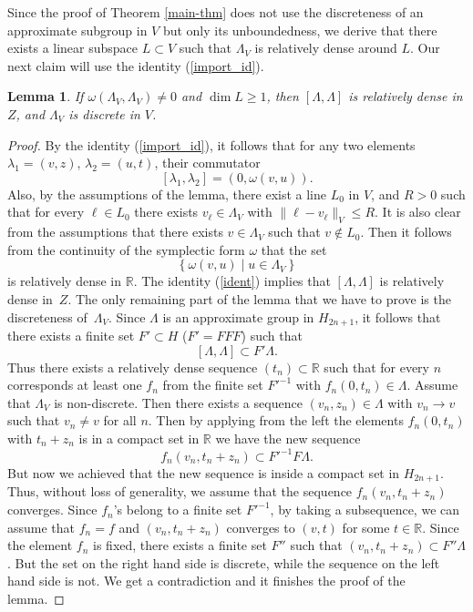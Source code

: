 \documentclass[10pt]{amsart}
\newcommand{\bR}{\mathbb{R}}
\newcounter{dummy} \numberwithin{dummy}{section}
\theoremstyle{plain}
\newtheorem{lemma}[dummy]{Lemma}
\theoremstyle{definition}
\begin{document}
Since the proof of Theorem \ref{main-thm} does not use the discreteness of an approximate subgroup in $V$ but only its unboundedness, we derive that there exists a linear subspace $L \subset V$ such that $\Lambda_V$ is relatively dense around $L$. Our next claim will use the identity (\ref{import_id}).

\begin{lemma}
\label{lem2}
If $\omega(\Lambda_V,\Lambda_V) \neq 0$ and $\dim L \ge 1$, then $[\Lambda,\Lambda]$ is relatively dense in $Z$, and $\Lambda_V$ is discrete in $V$.
\end{lemma}
\begin{proof}
By the identity (\ref{import_id}), it follows that for any two elements $\lambda_1 = (v,z)$, $\lambda_2 = (u,t)$, their commutator
\begin{equation}
\label{ident}
[\lambda_1,\lambda_2] = (0, \omega(v,u)).
\end{equation}
Also, by the assumptions of the lemma, there exist a line $L_0$ in $V$, and $R > 0$ such that for every $\ell \in L_0$ there exists $v_{\ell} \in \Lambda_V$ with $\| \ell - v_{\ell} \|_{V} \le R$. It is also clear from the assumptions that there exists $v \in \Lambda_V$ such that $v \not \in L_0$. Then it follows from the continuity of the symplectic form $\omega$ that the set
\[
\left\{ \omega(v,u) \mid u \in \Lambda_V \right\}
\]
is relatively dense in $\bR$. The identity (\ref{ident}) implies that $[\Lambda,\Lambda]$ is relatively dense in~$Z$.
The only remaining part of the lemma that we have to prove is the discreteness of~$\Lambda_V$.
Since $\Lambda$ is an approximate group in $H_{2n+1}$, it follows that there exists a finite set $F' \subset H$ ($F' = F F F$) such that
\[
[\Lambda,\Lambda] \subset F' \Lambda.
\]
Thus there exists a relatively dense sequence $(t_n) \subset \bR$ such that for every $n$ corresponds at least one
$f_n$ from the finite set $F'^{-1}$ with $f_n(0,t_n) \in \Lambda$.
Assume that $\Lambda_V$ is non-discrete. Then there exists a sequence $(v_n,z_n) \in \Lambda$ with $v_n \to v$ such that $v_n \neq v$ for all $n$. Then by applying from the left the elements $f_n (0,t_n)$ with $t_n+z_n$ is in a compact set in $\bR$ we have the new sequence
\[
f_n (v_n, t_n+z_n) \subset F'^{-1}F \Lambda.
\]
But now we achieved that the new sequence is inside a compact set in $H_{2n+1}$. Thus, without loss of generality, we assume that the sequence $f_n (v_n, t_n + z_n)$ converges.
Since $f_n$'s belong to a finite set $F'^{-1}$, by taking a subsequence, we can assume that $f_n = f$ and $(v_n,t_n+z_n)$ converges to $(v,t)$ for some $t \in \bR$. Since the element $f_n$ is fixed, there exists a finite set $F''$ such that $(v_n,t_n+z_n) \subset F'' \Lambda$. But the set on the right hand side is discrete, while the sequence on the left hand side is not. We get a contradiction and it finishes the proof of the lemma.
\end{proof}
\end{document}
